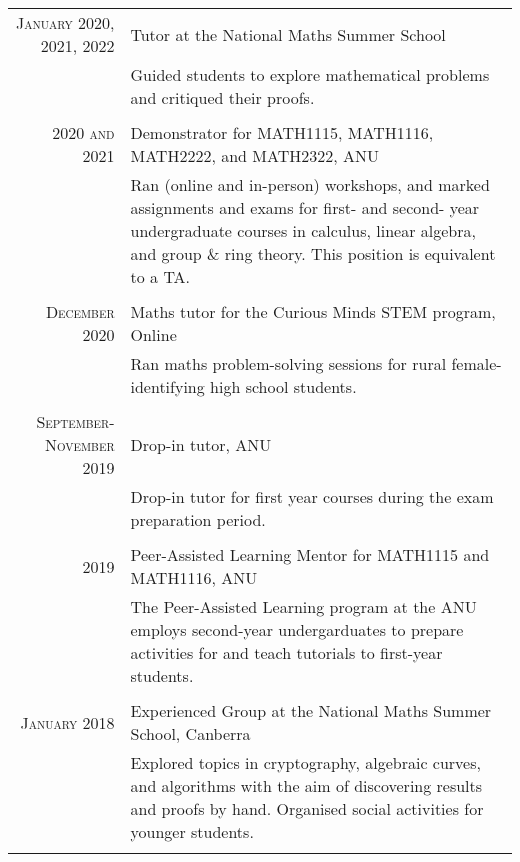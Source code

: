 \documentclass[a4paper,10pt]{article} %
\begin{document}
\begin{tabular}{r|p{12cm}}

\textsc{January 2020, 2021, 2022} & Tutor at the National Maths Summer School \emph{}\\
& \footnotesize{Guided students to explore mathematical problems and critiqued their proofs.}\\
\multicolumn{2}{c}{} \\


\textsc{2020 and 2021} & Demonstrator for MATH1115, MATH1116, MATH2222, and MATH2322, ANU \emph{}\\
& \footnotesize{Ran (online and in-person) workshops, and marked assignments and exams for first- and second- year undergraduate courses in calculus, linear algebra, and group \& ring theory. This position is equivalent to a TA.}\\
\multicolumn{2}{c}{} \\


\textsc{December 2020} & Maths tutor for the Curious Minds STEM program, Online \emph{}\\
& \footnotesize{Ran maths problem-solving sessions for rural female-identifying high school students.}\\
\multicolumn{2}{c}{} \\


\textsc{September-November 2019} & Drop-in tutor, ANU \emph{}\\
& \footnotesize{Drop-in tutor for first year courses during the exam preparation period.}\\
\multicolumn{2}{c}{} \\


\textsc{2019} & Peer-Assisted Learning Mentor for MATH1115 and MATH1116, ANU \emph{}\\
& \footnotesize{The Peer-Assisted Learning program at the ANU employs second-year undergarduates to prepare activities for and teach tutorials to first-year students.}\\
\multicolumn{2}{c}{} \\


\textsc{January 2018} & Experienced Group at the National Maths Summer School, Canberra \emph{}\\
& \footnotesize{Explored topics in cryptography, algebraic curves, and algorithms with the aim of discovering results and proofs by hand. Organised social activities for younger students.}\\
\multicolumn{2}{c}{} \\

\end{tabular}
\end{document}
